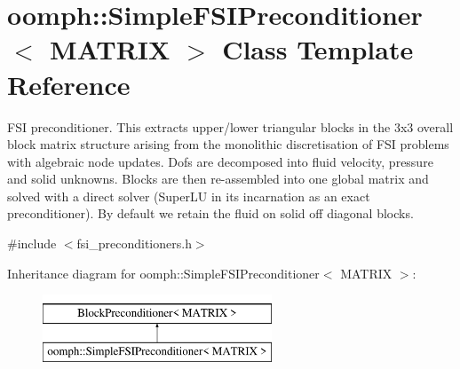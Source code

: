 \hypertarget{classoomph_1_1SimpleFSIPreconditioner}{}\section{oomph\+:\+:Simple\+F\+S\+I\+Preconditioner$<$ M\+A\+T\+R\+IX $>$ Class Template Reference}
\label{classoomph_1_1SimpleFSIPreconditioner}


F\+SI preconditioner. This extracts upper/lower triangular blocks in the 3x3 overall block matrix structure arising from the monolithic discretisation of F\+SI problems with algebraic node updates. Dofs are decomposed into fluid velocity, pressure and solid unknowns. Blocks are then re-\/assembled into one global matrix and solved with a direct solver (Super\+LU in its incarnation as an exact preconditioner). By default we retain the fluid on solid off diagonal blocks.  




{\ttfamily \#include $<$fsi\+\_\+preconditioners.\+h$>$}

Inheritance diagram for oomph\+:\+:Simple\+F\+S\+I\+Preconditioner$<$ M\+A\+T\+R\+IX $>$\+:\begin{figure}[H]
\begin{center}
\leavevmode
\includegraphics[height=2.000000cm]{classoomph_1_1SimpleFSIPreconditioner}
\end{center}
\end{figure}
